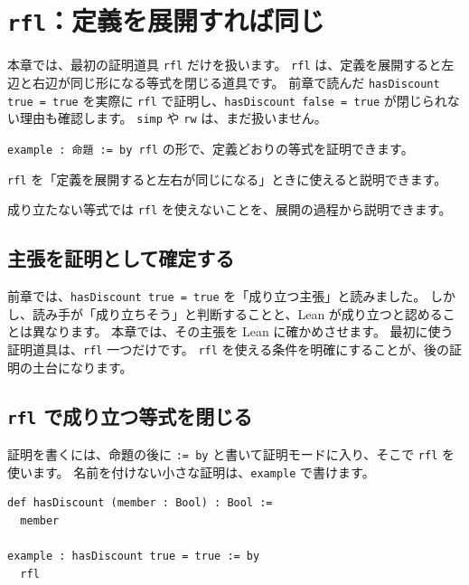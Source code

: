 \chapter{\texttt{rfl}：定義を展開すれば同じ}
\label{chap:ch04_rfl}

\begin{chapterabstract}
本章では、最初の証明道具 \texttt{rfl} だけを扱います。
\texttt{rfl} は、定義を展開すると左辺と右辺が同じ形になる等式を閉じる道具です。
前章で読んだ \texttt{hasDiscount true = true} を実際に \texttt{rfl} で証明し、\texttt{hasDiscount false = true} が閉じられない理由も確認します。
\texttt{simp} や \texttt{rw} は、まだ扱いません。
\end{chapterabstract}

\begin{learninggoals}
\item \texttt{example : 命題 := by rfl} の形で、定義どおりの等式を証明できます。
\item \texttt{rfl} を「定義を展開すると左右が同じになる」ときに使えると説明できます。
\item 成り立たない等式では \texttt{rfl} を使えないことを、展開の過程から説明できます。
\end{learninggoals}

\section{主張を証明として確定する}

前章では、\texttt{hasDiscount true = true} を「成り立つ主張」と読みました。
しかし、読み手が「成り立ちそう」と判断することと、Lean が成り立つと認めることは異なります。
本章では、その主張を Lean に確かめさせます。
最初に使う証明道具は、\texttt{rfl} 一つだけです。
\texttt{rfl} を使える条件を明確にすることが、後の証明の土台になります。

\section{\texttt{rfl} で成り立つ等式を閉じる}

証明を書くには、命題の後に \texttt{:= by} と書いて証明モードに入り、そこで \texttt{rfl} を使います。
名前を付けない小さな証明は、\texttt{example} で書けます。

\begin{listing}[htbp]
\begin{verbatim}
def hasDiscount (member : Bool) : Bool :=
  member

example : hasDiscount true = true := by
  rfl
\end{verbatim}
\caption{\texttt{hasDiscount true = true}}
\label{lst:ch04_rfl_success}
\end{listing}

